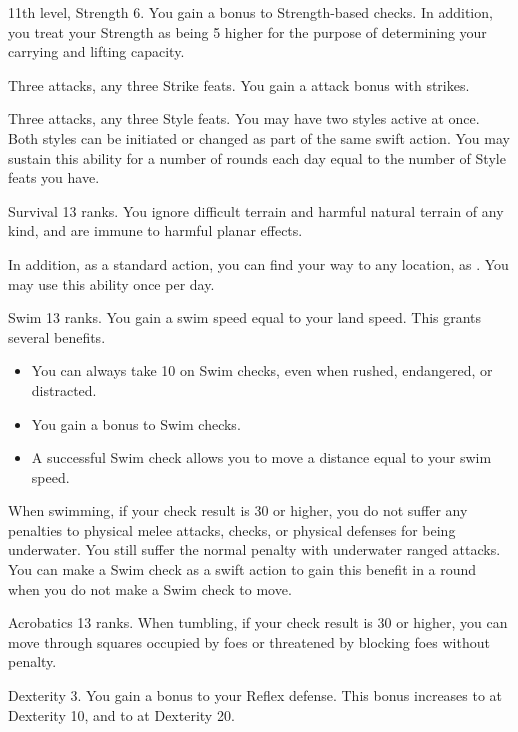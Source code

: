 \featpres 11th level, Strength 6.
\featben You gain a  bonus to Strength-based checks.
In addition, you treat your Strength as being 5 higher for the purpose of determining your carrying and lifting capacity.

\featpres Three attacks, any three Strike feats.
\featben You gain a  attack bonus with strikes.

\featpres Three attacks, any three Style feats.
\featben You may have two styles active at once.
Both styles can be initiated or changed as part of the same swift action.
You may sustain this ability for a number of rounds each day equal to the number of Style feats you have.

\featpre Survival 13 ranks.
\featben You ignore difficult terrain and harmful natural terrain of any kind, and are immune to harmful planar effects.

In addition, as a standard action, you can find your way to any location, as .
You may use this ability once per day.

\featpre Swim 13 ranks.
\featben You gain a swim speed equal to your land speed.
This grants several benefits.
\begin{itemize}
    \item You can always take 10 on Swim checks, even when rushed, endangered, or distracted.
    \item You gain a  bonus to Swim checks.
    \item A successful Swim check allows you to move a distance equal to your swim speed.
\end{itemize}

When swimming, if your check result is 30 or higher, you do not suffer any penalties to physical melee attacks, checks, or physical defenses for being underwater.
You still suffer the normal penalty with underwater ranged attacks.
You can make a Swim check as a swift action to gain this benefit in a round when you do not make a Swim check to move.

\featpre Acrobatics 13 ranks.
\featben When tumbling, if your check result is 30 or higher, you can move through squares occupied by foes or threatened by blocking foes without penalty.

\featpre Dexterity 3.
\featben You gain a  bonus to your Reflex defense.
This bonus increases to  at Dexterity 10, and to  at Dexterity 20.


